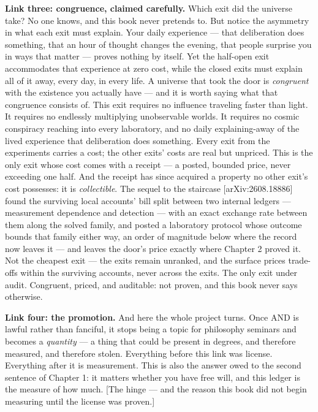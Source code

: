 \textbf{Link three: congruence, claimed carefully.} Which exit did the
universe take? No one knows, and this book never pretends to. But
notice the asymmetry in what each exit must explain. Your daily
experience --- that deliberation does something, that an hour of
thought changes the evening, that people surprise you in ways that
matter --- proves nothing by itself. Yet the half-open exit
accommodates that experience at zero cost, while the closed exits
must explain all of it away, every day, in every life. A universe
that took the door is \emph{congruent} with the existence you actually
have --- and it is worth saying what that congruence consists of. This
exit requires no influence traveling faster than light. It requires
no endlessly multiplying unobservable worlds. It requires no cosmic
conspiracy reaching into every laboratory, and no daily
explaining-away of the lived experience that deliberation does
something. Every exit from the experiments carries a cost; the other
exits' costs are real but unpriced. This is the only exit whose cost
comes with a receipt --- a posted, bounded price, never exceeding one
half. And the receipt has since acquired a property no other exit's
cost possesses: it is \emph{collectible}. The sequel to the staircase
{[}arXiv:2608.18886{]} found the surviving local accounts' bill split
between two internal ledgers --- measurement dependence and detection ---
with an exact exchange rate between them along the solved family, and
posted a laboratory protocol whose outcome bounds that family either
way, an order of magnitude below where the record now leaves it --- and
leaves the door's price exactly where Chapter 2 proved it. Not the
cheapest exit --- the exits remain unranked, and the
surface prices trade-offs within the surviving accounts, never across
the exits. The only exit under audit. Congruent, priced, and
auditable: not proven, and this book never says otherwise. 

\textbf{Link four: the promotion.} And here the whole project turns. Once
AND is lawful rather than fanciful, it stops being a topic for
philosophy seminars and becomes a \emph{quantity} --- a thing that could be
present in degrees, and therefore measured, and therefore stolen.
Everything before this link was license. Everything after it is
measurement. This is also the answer owed to the second sentence of
Chapter 1: it matters whether you have free will, and this ledger is
the measure of how much. {[}The hinge --- and the reason this book
did not begin measuring until the license was proven.{]}

